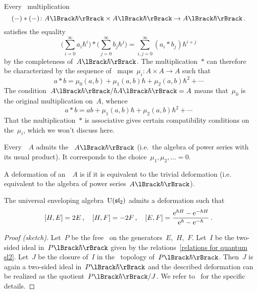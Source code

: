 \documentclass[a4paper, 11pt, oneside]{scrartcl}
\begin{document}
\begin{remark}
  Every~\bilinear{$\kfhbar$} multiplication
  \[
    (-) * (-)
    \colon
    \power{A}{\hbar} \times \power{A}{\hbar}
    \to
    \power{A}{\hbar} \,.
  \]
  satisfies the equality
  \[
    \Biggl( \sum_{i=0}^\infty a_i \hbar^i \Biggr)
    *
    \Biggl( \sum_{j=0}^\infty b_j \hbar^j \Biggr)
    =
    \sum_{i,j = 0}^\infty (a_i * b_j) \hbar^{i+j}
  \]
  by the completeness of~$\power{A}{\hbar}$.
  The multiplication~$*$ can therefore be characterized by the sequence of~\bilinear{$\kf$} maps~$\mu_i \colon A \times A \to A$ such that
  \[
    a * b
    =
    \mu_0(a, b) + \mu_1(a, b) \hbar + \mu_2(a, b) \hbar^2 + \dotsb
  \]
  The condition~$\power{A}{\hbar} / \hbar \power{A}{\hbar} = A$ means that~$\mu_0$ is the original multiplication on~$A$, whence
  \[
    a * b
    =
    ab + \mu_1(a, b) \hbar + \mu_2(a, b) \hbar^2 + \dotsb
  \]
  That the multiplication~$*$ is associative gives certain compatibility conditions on the~$\mu_i$, which we won’t discuss here.
\end{remark}

\begin{example}
  Every~\algebra{$\kf$}~$A$ admits the ~$\power{A}{\hbar}$ (i.e.\ the algebra of power series with its usual product).
  It corresponds to the choice~$\mu_1, \mu_2, \dotsc = 0$.
\end{example}

\begin{definition}
  A deformation of an~\algebra{$\kfhbar$}~$A$ is  if it is equivalent to the trivial deformation (i.e. equivalent to the algebra of power series~$\power{A}{\hbar}$).
\end{definition}

\begin{theorem}
  \label{existence of Uhsl2}
  The universal enveloping algebra~$\operatorname{U}(\mathfrak{sl}_2)$ admits a deformation such that 
  \begin{equation}
    \label{relations for quantum sl2}
    [H, E] = 2E \,,
    \quad
    [H, F] = -2F \,,
    \quad
    [E, F]
    =
    \frac{ \mathrm{e}^{\hbar H} - \mathrm{e}^{-\hbar H} }{ \mathrm{e}^{\hbar} - \mathrm{e}^{-\hbar} } \,.
  \end{equation}
\end{theorem}

\begin{proof}[Proof (sketch)]
  Let~$P$ be the free~\algebra{$\kf$} on the generators~$E$,~$H$,~$F$.
  Let~$I$ be the two-sided ideal in~$\power{P}{\hbar}$ given by the relations~\eqref{relations for quantum sl2}.
  Let~$J$ be the closure of~$I$ in the~\adic{$\hbar$} topology of~$\power{P}{\hbar}$.
  Then~$J$ is again a two-sided ideal in~$\power{P}{\hbar}$ and the described deformation can be realized as the quotient~$\power{P}{\hbar} / J$.
  We refer to~\cite[Definition-Proposition~6.4.3~ff.]{guide_to_quantum_groups} for the specific details.
\end{proof}
\end{document}
